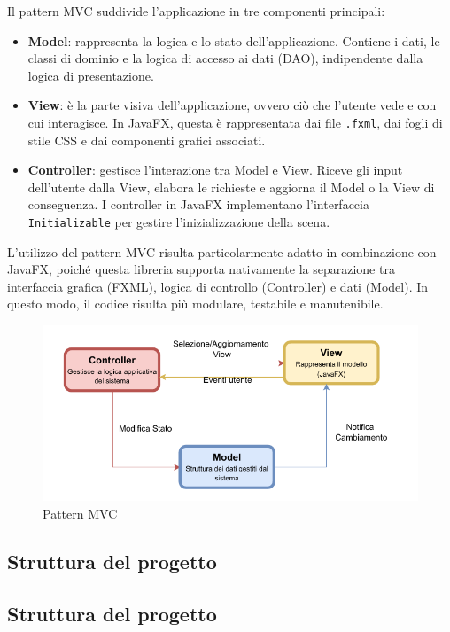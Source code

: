\documentclass[a4paper]{article}
\begin{document}
Il pattern MVC suddivide l'applicazione in tre componenti principali:

\begin{itemize}
    \item \textbf{Model}: rappresenta la logica e lo stato dell’applicazione. Contiene i dati, le classi di dominio e la logica di accesso ai dati (DAO), indipendente dalla logica di presentazione.

    \item \textbf{View}: è la parte visiva dell’applicazione, ovvero ciò che l’utente vede e con cui interagisce. In JavaFX, questa è rappresentata dai file \texttt{.fxml}, dai fogli di stile CSS e dai componenti grafici associati.

    \item \textbf{Controller}: gestisce l’interazione tra Model e View. Riceve gli input dell’utente dalla View, elabora le richieste e aggiorna il Model o la View di conseguenza. I controller in JavaFX implementano l’interfaccia \texttt{Initializable} per gestire l’inizializzazione della scena.
\end{itemize}

\bigskip

L'utilizzo del pattern MVC risulta particolarmente adatto in combinazione con JavaFX, poiché questa libreria supporta nativamente la separazione tra interfaccia grafica (FXML), logica di controllo (Controller) e dati (Model). In questo modo, il codice risulta più modulare, testabile e manutenibile.

\begin{figure}[H]
    \centering
    \includegraphics[width=0.7 \textwidth]{./figures/mvc_template}
    \caption{Pattern MVC}
    \label{fig:mvc_template}
\end{figure}

\subsection{Struttura del progetto}
\subsection{Struttura del progetto}
\end{document}
